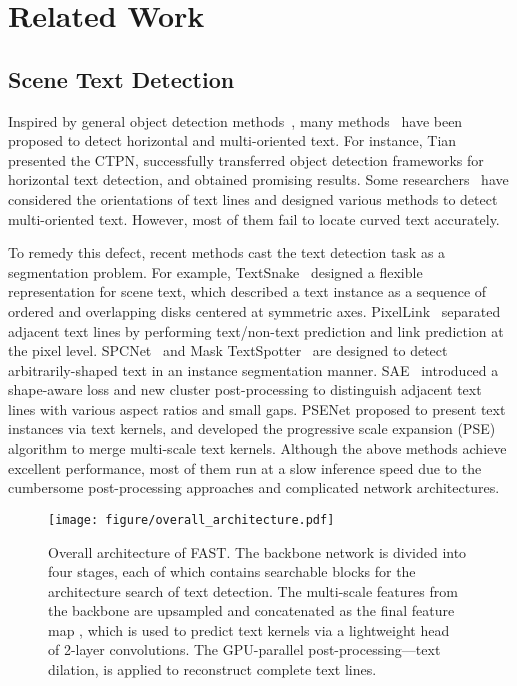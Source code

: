 \documentclass[lettersize,journal]{IEEEtran}
\begin{document}
\section{Related Work}

\subsection{Scene Text Detection}
Inspired by general object detection methods~\cite{liu2016ssd,ren2016faster,he2017mask}, many methods~\cite{liao2018textboxes++,liao2017textboxes,liao2018rotation,ma2018arbitrary,shi2017detecting,zhou2017east,tian2016detecting} have been proposed to detect horizontal and multi-oriented text. 
For instance, Tian \etal~\cite{tian2016detecting} presented the CTPN, successfully transferred object detection frameworks for horizontal text detection, and obtained promising results. 
Some researchers~\cite{zhou2017east,liao2018textboxes++,liao2018rotation} have considered the orientations of text lines and designed various methods to detect multi-oriented text. 
However, most of them fail to locate curved text accurately.

To remedy this defect, recent methods cast the text detection task as a segmentation problem.
For example, TextSnake~\cite{long2018textsnake} designed a flexible representation for scene text, which described a text instance as a sequence of ordered and overlapping disks centered at symmetric axes.
PixelLink~\cite{deng2018pixellink} separated adjacent text lines by performing text/non-text prediction and link prediction at the pixel level.
SPCNet~\cite{xie2019scene} and Mask TextSpotter~\cite{lyu2018mask} are designed to detect arbitrarily-shaped text in an instance segmentation manner.
SAE~\cite{tian2019learning} introduced a shape-aware loss and new cluster post-processing to distinguish adjacent text lines with various aspect ratios and small gaps.
PSENet \cite{wang2019shape} proposed to present text instances via text kernels, and developed the progressive scale expansion (PSE) algorithm to merge multi-scale text kernels.
Although the above methods achieve excellent performance, most of them run at a slow inference speed due to the cumbersome post-processing approaches and complicated network architectures.


\begin{figure*}[tbp]
    \centering
    \texttt{[image: figure/overall\_architecture.pdf]}
    \caption{
        Overall architecture of FAST.
        The backbone network is divided into four stages, each of which contains  searchable blocks for the architecture search of text detection.
        The multi-scale features from the backbone are upsampled and concatenated as the final feature map , which is used to predict text kernels via a lightweight head~\cite{wang2019efficient} of 2-layer convolutions.
        The GPU-parallel post-processing---text dilation, is applied to reconstruct complete text lines.
        }
    \label{fig:overall_architecture}
\end{figure*}
\end{document}
